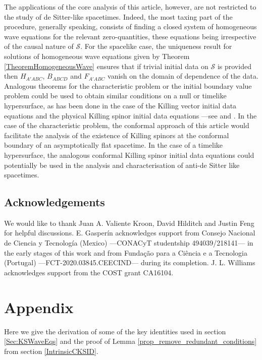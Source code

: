 \documentclass[10pt,a4paper]{article}
\theoremstyle{plain}
\begin{document}
The applications of the core analysis of this article, however, are
not restricted to the study of de Sitter-like spacetimes. Indeed, the
most taxing part of the procedure, generally speaking, consists of finding a closed system
of homogeneous wave equations for the relevant zero-quantities, these equations being irrespective of the causal nature
of $\mathcal{S}$. For the spacelike case, the uniqueness result for solutions of homogeneous wave equations given by Theorem \ref{TheoremHomogeneousWave} ensures that if
trivial initial data on $\mathcal{S}$ is provided then $H_{A'ABC}$,
$B_{ABCD}$ and $F_{A'ABC}$ vanish on the domain of dependence of the
data.  Analogous theorems for the characteristic problem or the
initial boundary value problem could be used to obtain similar
conditions on a null or timelike hypersurface, as has been done in the
case of the Killing vector initial data equations and the physical
Killing spinor initial data equations ---see \cite{Pae14a,
  ColRacVal18} and \cite{CarVal18}.  In the case of the characteristic
problem, the conformal approach of this article would facilitate the
analysis of the existence of Killing spinors at the conformal boundary
of an asymptotically flat spacetime.  In the case of a timelike
hypersurface, the analogous conformal Killing spinor initial data
equations could potentially be used in the analysis and characterisation of
anti-de Sitter like spacetimes.


\subsection*{Acknowledgements}

We would like to thank Juan A. Valiente Kroon, David Hilditch and
Justin Feng for helpful discussions.  E. Gasper\'in acknowledges
support from Consejo Nacional de Ciencia y Tecnolog\'ia (Mexico)
---CONACyT studentship 494039/218141--- in the early stages of this
work and from Fundaç\~ao para a Ci\^encia e a Tecnologia (Portugal)
---FCT-2020.03845.CEECIND--- during its completion. J. L. Williams
acknowledges support from the COST grant CA16104.  \appendix

\section{Appendix}\label{Appendix_A}

Here we give the derivation of some of the key identities used in
section \ref{Sec:KSWaveEqs} and the proof of Lemma
\ref{prop_remove_redundant_conditions} from section
\ref{IntrinsicCKSID}.
\end{document}
